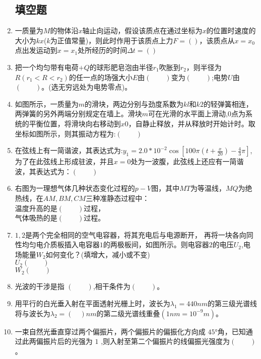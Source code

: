 \begin{enumerate}
\subsection{填空题}
\item 一质量为$M$的物体沿$x$轴止向运动，假设该质点在通过坐标为$x$的位置时速度的大小为$kx$($k$为正值常量)，则此时作用于该质点上力$F=()$，该质点从$x=x_0$点出发运动到$x=x_1$处所经历的时间$\Delta t=()$\\
\item 把一个均匀带有电荷$+Q$的球形肥皂泡由半径$r_1$吹胀到$r_2$，则半径为$R(r_1<R<r_2)$的任一点的场强大小$E$由$(\qquad)$变为$(\qquad)$;电势$U$由$(\qquad)$。(选无穷远处为电势零点)。
\item 如图所示，一质量为$m$的滑块，两边分别与劲度系数为$kl$和$k2$的轻弹簧相连，两弹簧的另外两端分别规定在墙上。滑块$m$可在光滑的水平面上滑动,$0$点为系统的平衡位置，将滑块向右移动到$x0$，自静止释放，并从释放时开始计时。取坐标如图所示，则其振动方程为:$(\qquad)$
\item 在弦线上有一简谐波，其表达式为:$y_1=2.0*10^{-2} \cos[100\pi(t+\frac{x}{20})-\frac{4}{3}\pi]$,为了在此弦线上形成驻波，并且$x=0$处为一波腹，此弦线上还应有一简谐波，其表达式为：$(\qquad)$
\item 右图为一理想气体几种状态变化过程的$p-V$图，其中$MT$为等温线，$MQ$为绝热线，在$AM,BM,CM$三种准静态过程中：\\
温度升高的是$(\qquad)$过程，\\
气体吸热的是$(\qquad)$过程。
\item $1,2$是两个完全相同的空气电容器，将其充电后与电源断开， 再将一块各向同性均匀电介质板插入电容器$1$的两极板间，如图所示。则电容器$2$的电压$U_2$,电场能量$W_2$如何变化？(填增大，减小或不变)\\
$U_2(\qquad)$\\
$W_2(\qquad)$
\item 光波的干涉是指 $(\qquad)$,相干条件为$(\qquad)$。
\item  用平行的白光垂入射在平面透射光栅上时，波长为$\lambda_1=440nm $的第三级光谱线将与波长为$\lambda_2=(\quad)nm$的第二级光谱线重叠$(1nm=10^{-9}m)$。
\item 一束自然光垂直穿过两个偏振片，两个偏振片的偏振化方向成 $45$°角，已知通过此两偏振片后的光强为 $1$ ,则入射至第二个偏振片的线偏振光强度为$(\qquad)$。

\end{enumerate}
